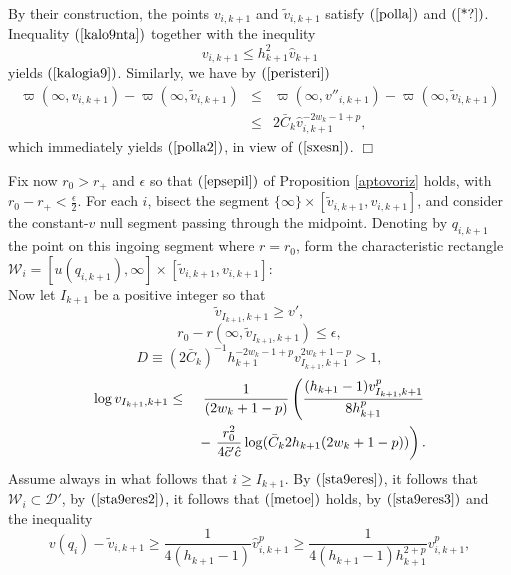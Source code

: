 \documentclass{article}
\begin{document}
By their construction,
the points $v_{i,k+1}$ and $\tilde{v}_{i,k+1}$ satisfy $(\ref{polla})$ and
$(\ref{*?})$. Inequality $(\ref{kalo9nta})$ together with 
the inequlity
\begin{equation}
\label{sxesn}
v_{i,k+1}\le h_{k+1}^2\hat{v}_{k+1}
\end{equation}
yields $(\ref{kalogia9})$. Similarly, we have by $(\ref{peristeri})$
\begin{eqnarray*}
\varpi(\infty,v_{i,k+1})-\varpi(\infty,\tilde{v}_{i,k+1})&\le&
\varpi(\infty,v''_{i,k+1})-\varpi(\infty,\tilde{v}_{i,k+1})\\
&\le&2\bar{C}_k\hat{v}_{i,k+1}^{-2w_k-1+p},
\end{eqnarray*}
which immediately yields $(\ref{polla2})$, in view of $(\ref{sxesn})$.
$\Box$

Fix now $r_0>r_+$ and $\epsilon$ so that $(\ref{epsepil})$ of 
Proposition \ref{aptovoriz} holds, with $r_0-r_+<\frac\epsilon2$.
For each $i$, bisect the segment
$\{\infty\}\times[\tilde{v}_{i,k+1},v_{i,k+1}]$, 
and consider the constant-$v$ null segment passing through the midpoint.
Denoting by $q_{i,k+1}$ the point on this ingoing segment where $r=r_0$,
form the characteristic rectangle $\mathcal{W}_i=[u(q_{i,k+1}),\infty]\times
[\tilde{v}_{i,k+1},v_{i,k+1}]$:
\[

\]
Now let $I_{k+1}$ be a positive integer so that
\begin{equation}
\label{sta9eres}
\tilde{v}_{I_{k+1},k+1}\ge v',
\end{equation}
\begin{equation}
\label{sta9eres2}
r_0-r(\infty,\tilde{v}_{I_{k+1},k+1})\le\epsilon,
\end{equation}
\begin{equation}
\label{Dorismos}
D\equiv(2\bar{C}_k)^{-1}h_{k+1}^{-2w_k-1+p}v_{I_{k+1},k+1}^{2w_k+1-p}>1,
\end{equation}
\begin{eqnarray}
\label{sta9eres3}
\nonumber
\log v_{I_{k+1},k+1}&\le&\frac1{(2w_k+1-p)}
\left(\frac{(h_{k+1}-1)v_{I_{k+1},k+1}^p}{8h^{p}_{k+1}}
\right.\\
&&\hbox{}-\left.\frac{r_0^2}{4\tilde{c}'\hat{c}}\log(\bar{C}_k2h_{k+1}(2w_k+1-p))\right).
\end{eqnarray}
Assume always in what follows that $i\ge I_{k+1}$. By 
$(\ref{sta9eres})$, it follows that
$\mathcal{W}_i\subset \mathcal{D}'$, by
$(\ref{sta9eres2})$, it follows that $(\ref{metoe})$ holds,  
by $(\ref{sta9eres3})$ and the
inequality 
\begin{equation}
\label{togegov}
v(q_i)-\tilde{v}_{i,k+1}\ge \frac1{4(h_{k+1}-1)}\hat{v}^p_{i,k+1}
\ge \frac1{4(h_{k+1}-1)h_{k+1}^{2+p}}v_{i,k+1}^p,
\end{equation}
\end{document}
